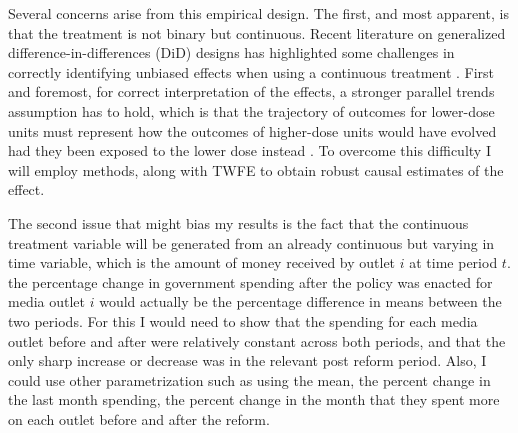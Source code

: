 \documentclass[14]{article}
\begin{document}
Several concerns arise from this empirical design. The first, and most apparent, is that the treatment is not binary but continuous. Recent literature on generalized difference-in-differences (DiD) designs has highlighted some challenges in correctly identifying unbiased effects when using a continuous treatment \citep{EventCont-Sant-AEA, Cont-Chaise-AEA, Cont-Sant-arxiv}. First and foremost, for correct interpretation of the effects, a stronger parallel trends assumption has to hold, which is that the trajectory of outcomes for lower-dose units must represent how the outcomes of higher-dose units would have evolved had they been exposed to the lower dose instead \citep{Cont-Sant-arxiv}. To overcome this difficulty I will employ \cite{Cont-Chaise-AEA, EventCont-Sant-AEA} methods, along with TWFE to obtain robust causal estimates of the effect. 

The second issue that might bias my results is the fact that the continuous treatment variable will be generated from an already continuous but varying in time variable, which is the amount of money received by outlet $i$ at time period $t$. the percentage change in government spending after the policy was enacted for media outlet $i$ would actually be the percentage difference in means between the two periods. For this I would need to show that the spending for each media outlet before and after were relatively constant across both periods, and that the only sharp increase or decrease was in the relevant post reform period. Also, I could use other parametrization such as using the mean, the percent change in the last month spending, the percent change in the month that they spent more on each outlet before and after the reform. 
\end{document}
